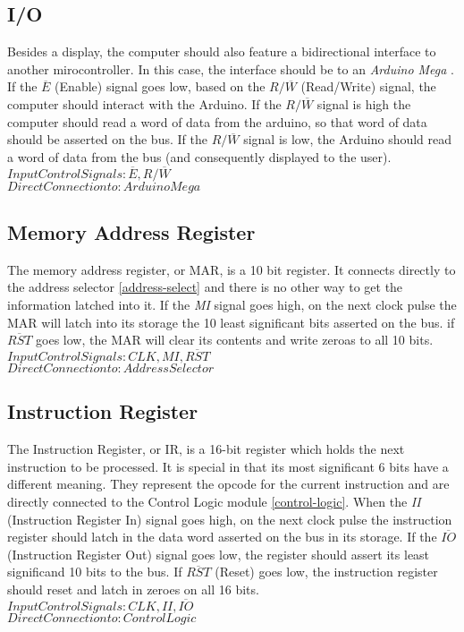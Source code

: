 \subsection{I/O} \label{io}
Besides a display, the computer should also feature a bidirectional interface to another mirocontroller. In this case,
the interface should be to an \emph{Arduino Mega} \cite{arduino2020mega}. If the \emph{$\overline{E}$} (Enable) signal goes low,
based on the \emph{$R/\overline{W}$} (Read/Write) signal, the computer should interact with the Arduino. If the
\emph{$R/\overline{W}$} signal is high the computer should read a word of data from the arduino, so that word of data should be
asserted on the bus. If the \emph{$R/\overline{W}$} signal is low, the Arduino should read a word of data from the bus (and
consequently displayed to the user). \\
\textbf{$Input Control Signals: \overline{E}, R/\overline{W}$} \\
\textbf{$Direct Connection to: Arduino Mega$}

\subsection{Memory Address Register} \label{mar}
The memory address register, or MAR, is a 10 bit register. It connects directly to the address selector \ref{address-select} and
there is no other way to get the information latched into it. If the \emph{MI} signal goes high, on the next clock pulse the MAR
will latch into its storage the 10 least significant bits asserted on the bus. if \emph{$\overline{RST}$} goes low, the MAR will
clear its contents and write zeroas to all 10 bits. \\
\textbf{$Input Control Signals: CLK, MI, \overline{RST}$} \\
\textbf{$Direct Connection to: Address Selector$}


\subsection{Instruction Register} \label{ir}
The Instruction Register, or IR, is a 16-bit register which holds the next instruction to be processed. It is special in that
its most significant 6 bits have a different meaning. They represent the opcode for the current instruction and are directly
connected to the Control Logic module \ref{control-logic}. When the \emph{II} (Instruction Register In) signal goes high, on the
next clock pulse the instruction register should latch in the data word asserted on the bus in its storage. If the
\emph{$\overline{IO}$} (Instruction Register Out) signal goes low, the register should assert its least significand 10 bits to the
bus. If \emph{$\overline{RST}$} (Reset) goes low, the instruction register should reset and latch in zeroes on all 16 bits. \\
\textbf{$Input Control Signals: CLK, II, \overline{IO}$} \\
\textbf{$Direct Connection to: Control Logic$}


